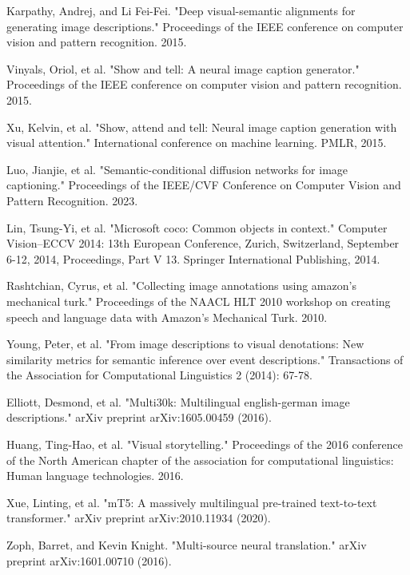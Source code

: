 \documentclass[runningheads]{llncs}
\begin{document}
\begin{thebibliography}{8}
Karpathy, Andrej, and Li Fei-Fei. "Deep visual-semantic alignments for generating image descriptions." Proceedings of the IEEE conference on computer vision and pattern recognition. 2015.

Vinyals, Oriol, et al. "Show and tell: A neural image caption generator." Proceedings of the IEEE conference on computer vision and pattern recognition. 2015.

Xu, Kelvin, et al. "Show, attend and tell: Neural image caption generation with visual attention." International conference on machine learning. PMLR, 2015.

Luo, Jianjie, et al. "Semantic-conditional diffusion networks for image captioning." Proceedings of the IEEE/CVF Conference on Computer Vision and Pattern Recognition. 2023.

Lin, Tsung-Yi, et al. "Microsoft coco: Common objects in context." Computer Vision–ECCV 2014: 13th European Conference, Zurich, Switzerland, September 6-12, 2014, Proceedings, Part V 13. Springer International Publishing, 2014.

Rashtchian, Cyrus, et al. "Collecting image annotations using amazon’s mechanical turk." Proceedings of the NAACL HLT 2010 workshop on creating speech and language data with Amazon’s Mechanical Turk. 2010.

Young, Peter, et al. "From image descriptions to visual denotations: New similarity metrics for semantic inference over event descriptions." Transactions of the Association for Computational Linguistics 2 (2014): 67-78.

Elliott, Desmond, et al. "Multi30k: Multilingual english-german image descriptions." arXiv preprint arXiv:1605.00459 (2016).

Huang, Ting-Hao, et al. "Visual storytelling." Proceedings of the 2016 conference of the North American chapter of the association for computational linguistics: Human language technologies. 2016.

Xue, Linting, et al. "mT5: A massively multilingual pre-trained text-to-text transformer." arXiv preprint arXiv:2010.11934 (2020).

Zoph, Barret, and Kevin Knight. "Multi-source neural translation." arXiv preprint arXiv:1601.00710 (2016).


\end{thebibliography}
\end{document}
